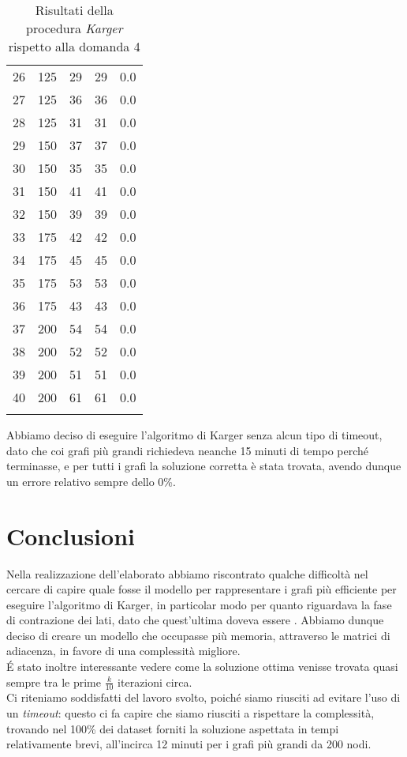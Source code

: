 \begin{center}
\begin{longtable}{|c|c|c|c|c|}
		26 & 125 & 29 & 29 & 0.0 \\
		27 & 125 & 36 & 36 & 0.0 \\
		28 & 125 & 31 & 31 & 0.0 \\
		29 & 150 & 37 & 37 & 0.0 \\
		30 & 150 & 35 & 35 & 0.0 \\
		31 & 150 & 41 & 41 & 0.0 \\
		32 & 150 & 39 & 39 & 0.0 \\
		33 & 175 & 42 & 42 & 0.0 \\
		34 & 175 & 45 & 45 & 0.0 \\
		35 & 175 & 53 & 53 & 0.0 \\
		36 & 175 & 43 & 43 & 0.0 \\
		37 & 200 & 54 & 54 & 0.0 \\
		38 & 200 & 52 & 52 & 0.0 \\
		39 & 200 & 51 & 51 & 0.0 \\
		40 & 200 & 61 & 61 & 0.0 \\
		\hline
		\caption{Risultati della procedura \textit{Karger} rispetto alla domanda 4}
		\label{error-results}
	\end{longtable}
\end{center}\vspace{-40pt}

Abbiamo deciso di eseguire l'algoritmo di Karger senza alcun tipo di timeout, dato che coi grafi più grandi richiedeva neanche 15 minuti di tempo perché terminasse, e per tutti i grafi la soluzione corretta è stata trovata, avendo dunque un errore relativo sempre dello 0\%.

\section{Conclusioni}

Nella realizzazione dell'elaborato abbiamo riscontrato qualche difficoltà nel cercare di capire quale fosse il modello per rappresentare i grafi più efficiente per eseguire l'algoritmo di Karger, in particolar modo per quanto riguardava la fase di contrazione dei lati, dato che quest'ultima doveva essere . Abbiamo dunque deciso di creare un modello che occupasse più memoria, attraverso le matrici di adiacenza, in favore di una complessità migliore.\\
\'E stato inoltre interessante vedere come la soluzione ottima venisse trovata quasi sempre tra le prime $\frac{k}{10}$ iterazioni circa.\\
Ci riteniamo soddisfatti del lavoro svolto, poiché siamo riusciti ad evitare l'uso di un \textit{timeout}: questo ci fa capire che siamo riusciti a rispettare la complessità, trovando nel 100\% dei dataset forniti la soluzione aspettata in tempi relativamente brevi, all'incirca 12 minuti per i grafi più grandi da 200 nodi.

